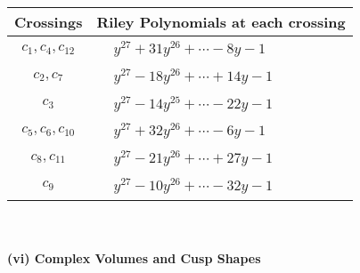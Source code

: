 \documentclass[1p]{elsarticle_modified}
\theoremstyle{definition}
\begin{document}
\begin{tabular}{m{50pt}|m{274pt}}
Crossings & \hspace{64pt}Riley Polynomials at each crossing \\
\hline $$\begin{aligned}c_{1},c_{4},c_{12}\end{aligned}$$&$\begin{aligned}
&y^{27}+31 y^{26}+\cdots-8 y-1
\end{aligned}$\\
\hline $$\begin{aligned}c_{2},c_{7}\end{aligned}$$&$\begin{aligned}
&y^{27}-18 y^{26}+\cdots+14 y-1
\end{aligned}$\\
\hline $$\begin{aligned}c_{3}\end{aligned}$$&$\begin{aligned}
&y^{27}-14 y^{25}+\cdots-22 y-1
\end{aligned}$\\
\hline $$\begin{aligned}c_{5},c_{6},c_{10}\end{aligned}$$&$\begin{aligned}
&y^{27}+32 y^{26}+\cdots-6 y-1
\end{aligned}$\\
\hline $$\begin{aligned}c_{8},c_{11}\end{aligned}$$&$\begin{aligned}
&y^{27}-21 y^{26}+\cdots+27 y-1
\end{aligned}$\\
\hline $$\begin{aligned}c_{9}\end{aligned}$$&$\begin{aligned}
&y^{27}-10 y^{26}+\cdots-32 y-1
\end{aligned}$\\
\hline
\end{tabular}\\~\\
\newpage\flushleft \textbf{(vi) Complex Volumes and Cusp Shapes}
\end{document}

